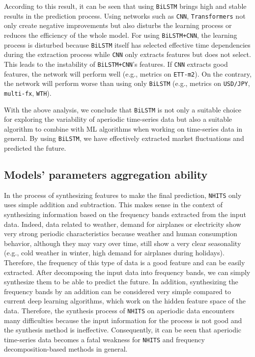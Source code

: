 \documentclass[a4paper,fleqn]{cas-sc}
\begin{document}
According to this result, it can be seen that using \verb|BiLSTM| brings high and stable results in the prediction process. Using networks such as \verb|CNN|, \verb|Transformers| not only create negative improvements but also disturbs the learning process or reduces the efficiency of the whole model. For using \verb|BiLSTM+CNN|, the learning process is disturbed because \verb|BiLSTM| itself has selected effective time dependencies during the extraction process while \verb|CNN| only extracts features but does not select. This leads to the instability of \verb|BiLSTM+CNN|'s features. If \verb|CNN| extracts good features, the network will perform well (e.g., metrics on \verb|ETT-m2|). On the contrary, the network will perform worse than using only \verb|BiLSTM| (e.g., metrics on \verb|USD/JPY|, \verb|multi-fx|, \verb|WTH|).

\vspace{1mm}

With the above analysis, we conclude that \verb|BiLSTM| is not only a suitable choice for exploring the variability of aperiodic time-series data but also a suitable algorithm to combine with ML algorithms when working on time-series data in general. By using \Verb|BiLSTM|, we have effectively extracted market fluctuations and predicted the future.

\subsection{Models' parameters aggregation ability}

In the process of synthesizing features to make the final prediction, \verb|NHITS| only uses simple addition and subtraction. This makes sense in the context of synthesizing information based on the frequency bands extracted from the input data. Indeed, data related to weather, demand for airplanes or electricity show very strong periodic characteristics because weather and human consumption behavior, although they may vary over time, still show a very clear seasonality (e.g., cold weather in winter, high demand for airplanes during holidays). Therefore, the frequency of this type of data is a good feature and can be easily extracted. After decomposing the input data into frequency bands, we can simply synthesize them to be able to predict the future. In addition, synthesizing the frequency bands by an addition can be considered very simple compared to current deep learning algorithms, which work on the hidden feature space of the data. Therefore, the synthesis process of \verb|NHITS| on aperiodic data encounters many difficulties because the input information for the process is not good and the synthesis method is ineffective. Consequently, it can be seen that aperiodic time-series data becomes a fatal weakness for \verb|NHITS| and frequency decomposition-based methods in general.
\end{document}
